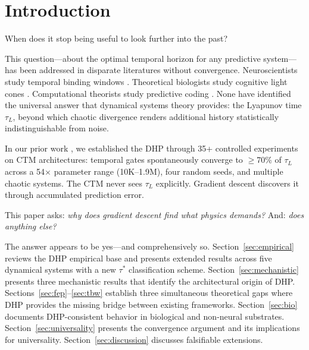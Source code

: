\documentclass[12pt]{article}
\begin{document}
\section{Introduction}
\label{sec:intro}

When does it stop being useful to look further into the past?

This question---about the optimal temporal horizon for any predictive system---has been
addressed in disparate literatures without convergence. Neuroscientists study temporal
binding windows \citep{poppel1997hierarchical,vanrullen2003perception}. Theoretical
biologists study cognitive light cones \citep{levin2019computational}. Computational
theorists study predictive coding \citep{friston2010free}. None have identified the
universal answer that dynamical systems theory provides: the Lyapunov time $\tau_L$,
beyond which chaotic divergence renders additional history statistically indistinguishable
from noise.

In our prior work \citep{caldwell2026a,caldwell2026b,caldwell2026c,caldwell2026d}, we
established the DHP through 35+ controlled experiments on CTM architectures: temporal
gates spontaneously converge to $\geq$70\% of $\tau_L$ across a 54$\times$ parameter
range (10K--1.9M), four random seeds, and multiple chaotic systems. The CTM never sees
$\tau_L$ explicitly. Gradient descent discovers it through accumulated prediction error.

This paper asks: \textit{why does gradient descent find what physics demands?} And:
\textit{does anything else?}

The answer appears to be yes---and comprehensively so. Section~\ref{sec:empirical} reviews
the DHP empirical base and presents extended results across five dynamical systems with a
new $\tau^*$ classification scheme. Section~\ref{sec:mechanistic} presents three
mechanistic results that identify the architectural origin of DHP.
Sections~\ref{sec:fep}--\ref{sec:tbw} establish three simultaneous theoretical gaps where
DHP provides the missing bridge between existing frameworks. Section~\ref{sec:bio} documents
DHP-consistent behavior in biological and non-neural substrates.
Section~\ref{sec:universality} presents the convergence argument and its implications for
universality. Section~\ref{sec:discussion} discusses falsifiable extensions.

\end{document}

